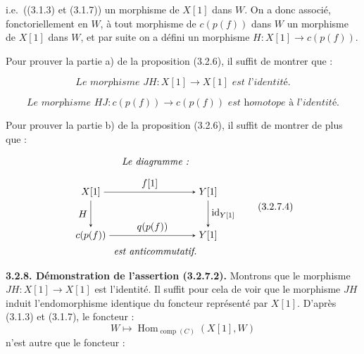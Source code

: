 \clearpage
{}%
i.e.\ ((3.1.3) et (3.1.7)) un morphisme de $X[1]$ dans $W$. On a donc
associé, fonctoriellement en $W$, à tout morphisme de $c(p(f))$ dans $W$ un
morphisme de $X[1]$ dans $W$, et par suite on a défini un morphisme
$H\colon X[1]\longrightarrow c(p(f))$.

Pour prouver la partie a) de la proposition (3.2.6), il suffit de montrer
que :

\begin{equation}
  \textit{Le morphisme }JH\colon X[1]\longrightarrow X[1]
  \textit{ est l'identité.}
  \tag{3.2.7.2}
\end{equation}

\begin{equation}
  \textit{Le morphisme }HJ\colon c(p(f))\longrightarrow c(p(f))
  \textit{ est homotope à l'identité.}
  \tag{3.2.7.3}
\end{equation}

Pour prouver la partie b) de la proposition (3.2.6), il suffit de montrer de
plus que :

\begin{equation}
  \begin{gathered}
    \textit{Le diagramme :}\\[0.35em]
    \begin{tikzpicture}[>=stealth,baseline=(current bounding box.center)]
      \node (Xs)  at (0,1.55) {$X[1]$};
      \node (Ys1) at (4.2,1.55) {$Y[1]$};
      \node (Cpf) at (0,0) {$c(p(f))$};
      \node (Ys2) at (4.2,0) {$Y[1]$};
      \draw[->] (Xs) -- node[above] {$f[1]$} (Ys1);
      \draw[->] (Xs) -- node[left] {$H$} (Cpf);
      \draw[->] (Ys1) -- node[right] {$\operatorname{id}_{Y[1]}$} (Ys2);
      \draw[->] (Cpf) -- node[above] {$q(p(f))$} (Ys2);
    \end{tikzpicture}\\[-0.15em]
    \textit{est anticommutatif.}
  \end{gathered}
  \tag{3.2.7.4}
\end{equation}

\noindent\textbf{3.2.8. Démonstration de l'assertion (3.2.7.2).}\quad
{}
Montrons que le morphisme $JH\colon X[1]\longrightarrow X[1]$ est
l'identité. Il suffit pour cela de voir que le morphisme $JH$ induit
l'endomorphisme identique du foncteur représenté par $X[1]$.
D'après (3.1.3) et (3.1.7), le foncteur :
\begin{equation*}
  W\longmapsto
  \operatorname{Hom}_{\operatorname{comp}(C)}(X[1],W)
\end{equation*}
n'est autre que le foncteur :

